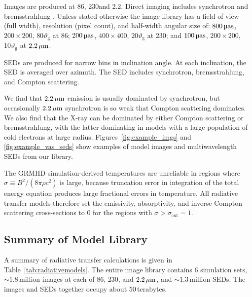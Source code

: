 Images are produced at 86\GHz, 230\GHz and 2.2\um.
Direct imaging includes synchrotron and bremsstrahlung \citep[both ion-electron and electron-electron; see][for a recent review]{2020ApJ...898...50Y}.
Unless stated otherwise the image library has a field of view (full width), resolution (pixel count), and half-width angular size of: $800\uas$, $200 \times 200$, $80 \vartheta_\mathrm{g}$ at 86\GHz; $200\uas$, $400 \times 400$, $20 \vartheta_\mathrm{g}$ at 230\GHz; and $100\uas$, $200\times 200$, $10 \vartheta_\mathrm{g}$ at $2.2\,\mu\mathrm{m}$.

SEDs are produced for narrow bins in inclination angle.
At each inclination, the SED is averaged over azimuth.
The SED includes synchrotron, bremsstrahlung, and Compton scattering.

We find that $2.2\,\mu\mathrm{m}$ emission is usually dominated by synchrotron, but occasionally $2.2\,\mu\mathrm{m}$ synchrotron is so weak that Compton scattering dominates.
We also find that the X-ray can be dominated by either Compton scattering or bremsstrahlung, with the latter dominating in models with a large population of cold electrons at large radius.
Figures~\ref{fig:example_imgs} and \ref{fig:example_vas_seds} show examples of model images and multiwavelength SEDs from our library.

The GRMHD simulation-derived temperatures are unreliable in regions where $\sigma \equiv B^2/(8\pi\rho c^2)$ is large, because truncation error in integration of the total energy equation produces large fractional errors in temperature.
All radiative transfer models therefore set the emissivity, absorptivity, and inverse-Compton scattering cross-sections to $0$ for the regions with $\sigma > \sigma_\mathrm{cut} = 1$.

\subsection{Summary of \texorpdfstring{\sgra}{Sgr A*} Model Library}


A summary of radiative transfer calculations is given in Table~\ref{tab:radiativemodels}.
The entire image library contains $6$ simulation sets,  $\sim 1.8$\,million images at each of 86\GHz, 230\GHz, and $2.2\,\mu\mathrm{m}$, and $\sim 1.3$\,million SEDs.
The images and SEDs together occupy about $50$\,terabytes.

